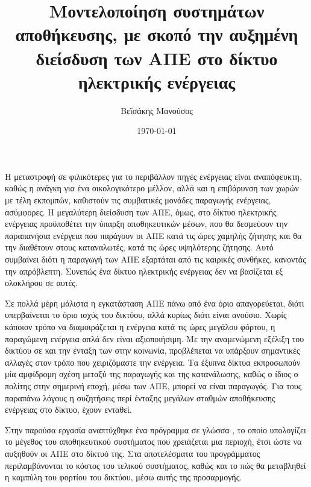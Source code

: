 \documentclass[12pt]{report}
\author{Βεϊσάκης Μανούσος}
\title{Μοντελοποίηση συστημάτων αποθήκευσης, με σκοπό την αυξημένη διείσδυση των ΑΠΕ στο δίκτυο ηλεκτρικής ενέργειας}
\date{\today}
\begin{document}
\maketitle
\tableofcontents
\chapter*{{}}
Η μεταστροφή σε φιλικότερες για το περιβάλλον πηγές ενέργειας είναι αναπόφευκτη, καθώς η ανάγκη για ένα οικολογικότερο μέλλον, αλλά και η επιβάρυνση των χωρών με τέλη εκπομπών, καθιστούν τις συμβατικές μονάδες παραγωγής ενέργειας,
ασύμφορες. Η μεγαλύτερη διείσδυση των ΑΠΕ, όμως, στο δίκτυο ηλεκτρικής ενέργειας προϋποθέτει την ύπαρξη αποθηκευτικών μέσων, που θα δεσμεύουν την παραπανήσια ενέργεια που παράγουν οι ΑΠΕ κατά τις ώρες
χαμηλής ζήτησης και θα την διαθέτουν στους καταναλωτές, κατά τις ώρες υψηλότερης ζήτησης. 
Αυτό συμβαίνει διότι η παραγωγή των ΑΠΕ εξαρτάται από τις καιρικές συνθήκες, κανοντάς την απρόβλεπτη. Συνεπώς ένα δίκτυο ηλεκτρικής ενέργειας δεν να βασίζεται εξ ολοκλήρου σε αυτές.

Σε πολλά μέρη μάλιστα η εγκατάσταση ΑΠΕ πάνω από ένα όριο απαγορεύεται, διότι υπερβαίνεται το όριο ισχύς του δικτύου, αλλά κυρίως διότι είναι ανούσιο. Χωρίς κάποιον τρόπο να διαμοιράζεται η ενέργεια κατά τις ώρες μεγάλου φόρτου, 
η παραγώμενη ενέργεια απλά δεν είναι αξιοποιήσιμη.
Με την αναμενώμενη εξέλιξη του δικτύου σε {} και την ένταξη των {} στην κοινωνία, προβλέπεται να υπάρξουν σημαντικές αλλαγές στον τρόπο που χειριζόμαστε την ενέργεια. Τα έξυπνα
δίκτυα εκπροσωπούν μία αμφίδρομη σχέση μεταξύ της παραγωγής και της κατανάλωσης, καθώς ο ίδιος ο πολίτης στην σημερινή εποχή, μέσω των ΑΠΕ, μπορεί να είναι παραγωγός. Για τους παραπάνω λόγους η συζητήσεις 
περί ένταξης μεγάλων σταθμών αποθήκευσης ενέργειας στο δίκτυο, έχουν ενταθεί. 

Στην παρούσα εργασία αναπτύχθηκε ένα πρόγραμμα σε γλώσσα {}, το οποίο υπολογίζει το μέγεθος του αποθηκευτικού συστήματος που χρειάζεται μια περιοχή, έτσι ώστε να αυξηθούν οι ΑΠΕ στο δίκτυό της. 
Στα αποτελέσματα του προγράμματος περιλαμβάνονται το κόστος του τελικού συστήματος, καθώς και το πώς θα μεταβληθεί η καμπύλη του φορτίου του δικτύου, μέσω αυτής της προσαρμογής.
\end{document}
